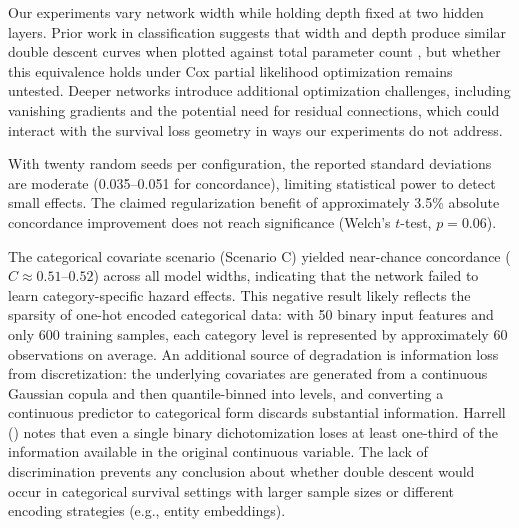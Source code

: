 \documentclass[12pt,a4paper]{article}
\begin{document}
Our experiments vary network width while holding depth fixed at two hidden layers. Prior work in classification suggests that width and depth produce similar double descent curves when plotted against total parameter count \citep{nakkiran2021deep}, but whether this equivalence holds under Cox partial likelihood optimization remains untested. Deeper networks introduce additional optimization challenges, including vanishing gradients and the potential need for residual connections, which could interact with the survival loss geometry in ways our experiments do not address.

With twenty random seeds per configuration, the reported standard deviations are moderate (0.035--0.051 for concordance), limiting statistical power to detect small effects. The claimed regularization benefit of approximately 3.5\% absolute concordance improvement does not reach significance (Welch's $t$-test, $p = 0.06$).

The categorical covariate scenario (Scenario C) yielded near-chance concordance ($C \approx 0.51$--$0.52$) across all model widths, indicating that the network failed to learn category-specific hazard effects. This negative result likely reflects the sparsity of one-hot encoded categorical data: with 50 binary input features and only 600 training samples, each category level is represented by approximately 60 observations on average. An additional source of degradation is information loss from discretization: the underlying covariates are generated from a continuous Gaussian copula and then quantile-binned into levels, and converting a continuous predictor to categorical form discards substantial information. Harrell (\citeyear{harrell2015regression}) notes that even a single binary dichotomization loses at least one-third of the information available in the original continuous variable. The lack of discrimination prevents any conclusion about whether double descent would occur in categorical survival settings with larger sample sizes or different encoding strategies (e.g., entity embeddings). 
\end{document}
